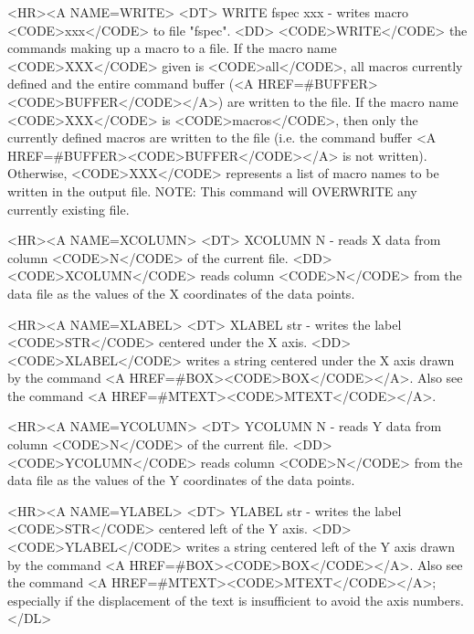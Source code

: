 \begin{rawhtml}
<HR><A NAME=WRITE>
<DT>
WRITE fspec xxx - writes macro <CODE>xxx</CODE> to file "fspec".
<DD>
	<CODE>WRITE</CODE> the commands making up a macro to a file.
	If the macro name <CODE>XXX</CODE> given is <CODE>all</CODE>,
	all macros currently defined and the entire command buffer
	(<A HREF=#BUFFER><CODE>BUFFER</CODE></A>) are written to the
	file.  If the macro name <CODE>XXX</CODE> is <CODE>macros</CODE>,
	then only the currently defined macros are written to the file
	(i.e. the command buffer <A HREF=#BUFFER><CODE>BUFFER</CODE></A>
	is not written).  Otherwise, <CODE>XXX</CODE> represents a list
	of macro names to be written in the output file.
	NOTE: This command will OVERWRITE any currently existing file.

<HR><A NAME=XCOLUMN>
<DT>
XCOLUMN N - reads X data from column <CODE>N</CODE> of the current file.
<DD>
	<CODE>XCOLUMN</CODE> reads column <CODE>N</CODE> from the
	data file as the values of the X coordinates of the data points.

<HR><A NAME=XLABEL>
<DT>
XLABEL str - writes the label <CODE>STR</CODE> centered under the X axis.
<DD>
	<CODE>XLABEL</CODE> writes a string centered under the
	X axis drawn by the command <A HREF=#BOX><CODE>BOX</CODE></A>.
	Also see the command <A HREF=#MTEXT><CODE>MTEXT</CODE></A>.

<HR><A NAME=YCOLUMN>
<DT>
YCOLUMN N - reads Y data from column <CODE>N</CODE> of the current file.
<DD>
	<CODE>YCOLUMN</CODE> reads column <CODE>N</CODE> from the
	data file as the values of the Y coordinates of the data points.

<HR><A NAME=YLABEL>
<DT>
YLABEL str - writes the label <CODE>STR</CODE> centered left of the Y axis.
<DD>
	<CODE>YLABEL</CODE> writes a string centered left of the Y axis
	drawn by the command <A HREF=#BOX><CODE>BOX</CODE></A>.  Also
	see the command <A HREF=#MTEXT><CODE>MTEXT</CODE></A>;
	especially if the displacement of the text is insufficient to
	avoid the axis numbers.
</DL>

\end{rawhtml}
